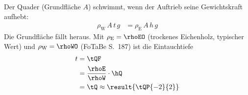 \begin{center}
\end{center}

Der Quader (Grundfläche $A$) schwimmt, wenn der Auftrieb seine Gewichtskraft aufhebt:
\begin{align}
 \rho_\text{W}\,A\,t\,g &= \rho_\text{E}\,A\,h\,g
\end{align}
Die Grundfläche fällt heraus. Mit $\rho_\text{E} = \rhoEO$ (trockenes Eichenholz, typischer Wert) und $\rho_\text{W} = \rhoWO$ (FoTaBe S.~187) ist die Eintauchtiefe
\begin{align}
 t &= \tQF \\
   &= \frac{\rhoE}{\rhoW}\cdot\hQ \\
   &= \tQ \approx \result{\tQP{-2}{2}}
\end{align}

